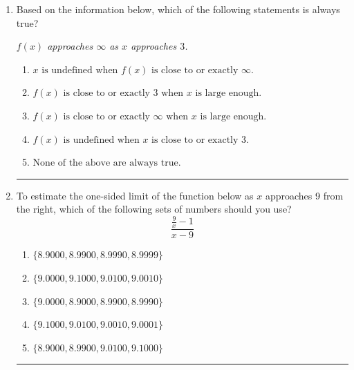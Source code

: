 \documentclass[14pt]{extbook}
\newcommand{\litem}[1]{\item#1\hspace*{-1cm}\rule{\textwidth}{0.4pt}}
\begin{document}
\begin{enumerate}
{\begin{enumerate}[label=\Alph*.]
\end{enumerate} }
\litem{
Based on the information below, which of the following statements is always true?
\begin{center}
    \textit{ $f(x)$ approaches $\infty$ as $x$ approaches $3$. }
\end{center}
\begin{enumerate}[label=\Alph*.]
\item \( x \text{ is undefined when } f(x) \text{ is close to or exactly } \infty. \)
\item \( f(x) \text{ is close to or exactly } 3 \text{ when } x \text{ is large enough}. \)
\item \( f(x) \text{ is close to or exactly } \infty \text{ when } x \text{ is large enough}. \)
\item \( f(x) \text{ is undefined when } x \text{ is close to or exactly } 3. \)
\item \( \text{None of the above are always true.} \)

\end{enumerate} }
\litem{
To estimate the one-sided limit of the function below as $x$ approaches 9 from the right, which of the following sets of numbers should you use?\[ \frac{\frac{9}{x} - 1}{x - 9} \]\begin{enumerate}[label=\Alph*.]
\item \( \{ 8.9000, 8.9900, 8.9990, 8.9999 \} \)
\item \( \{ 9.0000, 9.1000, 9.0100, 9.0010 \} \)
\item \( \{ 9.0000, 8.9000, 8.9900, 8.9990 \} \)
\item \( \{ 9.1000, 9.0100, 9.0010, 9.0001 \} \)
\item \( \{ 8.9000, 8.9900, 9.0100, 9.1000 \} \)

\end{enumerate} }
\end{enumerate}
\end{document}
